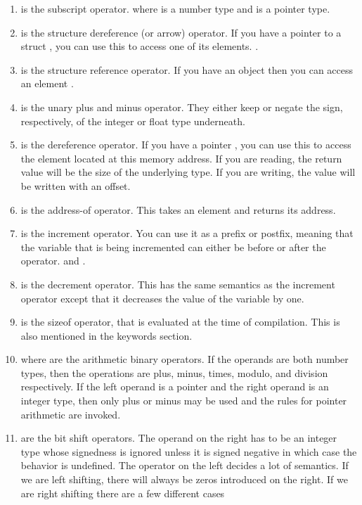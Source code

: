 \begin{enumerate}
	\item \keyword{[]} is the subscript operator.  where  is a number type and  is a pointer type.
	\item \keyword{->} is the structure dereference (or arrow) operator. If you have a pointer to a struct , you can use this to access one of its elements. .
	\item {} is the structure reference operator. If you have an object  then you can access an element .
	\item {} is the unary plus and minus operator. They either keep or negate the sign, respectively, of the integer or float type underneath.
	\item {} is the dereference operator. If you have a pointer , you can use this to access the element located at this memory address. If you are reading, the return value will be the size of the underlying type. If you are writing, the value will be written with an offset.
	\item {} is the address-of operator. This takes an element and returns its address.
	\item \keyword{++} is the increment operator. You can use it as a prefix or postfix, meaning that the variable that is being incremented can either be before or after the operator.  and .
	\item \keyword{--} is the decrement operator. This has the same semantics as the increment operator except that it decreases the value of the variable by one.
	\item {} is the sizeof operator, that is evaluated at the time of compilation. This is also mentioned in the keywords section.
	\item {} where  are the arithmetic binary operators. If the operands are both number types, then the operations are plus, minus, times, modulo, and division respectively. If the left operand is a pointer and the right operand is an integer type, then only plus or minus may be used and the rules for pointer arithmetic are invoked.
	\item \keyword{>>/<<} are the bit shift operators. The operand on the right has to be an integer type whose signedness is ignored unless it is signed negative in which case the behavior is undefined. The operator on the left decides a lot of semantics. If we are left shifting, there will always be zeros introduced on the right. If we are right shifting there are a few different cases

\end{enumerate}

